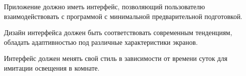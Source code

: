 Приложение должно иметь интерфейс, позволяющий пользователю взаимодействовать с программой с минимальной предварительной
подготовкой.

Дизайн интерфейса должен быть соответствовать современным тенденциям, обладать адаптивностью под различные
характеристики экранов.

Интерфейс должен менять свой стиль в зависимости от времени суток для имитации освещения в комнате.
